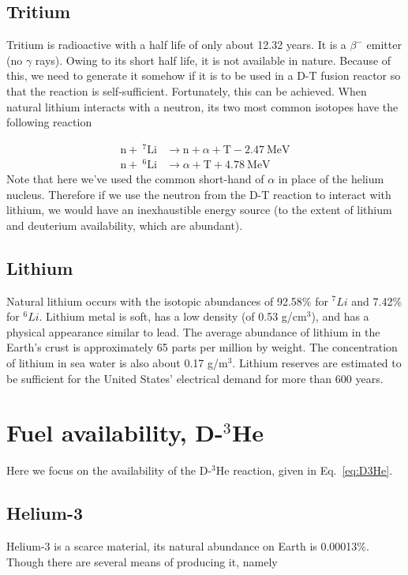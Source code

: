 \documentclass[11pt]{report} %
\begin{document}
\subsection{Tritium}
Tritium is radioactive with a half life of only about 12.32 years. It is a $\beta^-$ emitter (no $\gamma$ rays). Owing to its short half life, it is not available in nature. Because of this, we need to generate it somehow if it is to be used in a D-T fusion reactor so that the reaction is self-sufficient. Fortunately, this can be achieved. When natural lithium interacts with a neutron, its two most common isotopes have the following reaction

\begin{align}
\mathrm{n} + ~^7\mathrm{Li} &\xrightarrow ~\mathrm{n}+\alpha + \mathrm{T} -2.47~\text{MeV}\label{eq:Li7T}\\
\mathrm{n} + ~^6\mathrm{Li} &\xrightarrow ~ \alpha + \mathrm{T} +4.78~\text{MeV} \label{eq:Li6T}
\end{align}
Note that here we've used the common short-hand of $\alpha$ in place of the helium nucleus. Therefore if we use the neutron from the D-T reaction to interact with lithium, we would have an inexhaustible energy source (to the extent of lithium and deuterium availability, which are abundant).


\subsection{Lithium}

Natural lithium occurs with the isotopic abundances of 92.58\% for $^7Li$ and 7.42\% for $^6Li$. Lithium metal is soft, has a low density (of 0.53 g/cm$^3$), and has a physical appearance similar to lead. The average abundance of lithium in the Earth's crust is approximately 65 parts per million by weight. The concentration of lithium in sea water is also about 0.17 g/m$^3$. Lithium reserves are estimated to be sufficient for the United States' electrical demand for more than 600 years.

\section{Fuel availability, D-$^3$He}
Here we focus on the availability of the D-$^3$He reaction, given in Eq.~\ref{eq:D3He}.

\subsection{Helium-3}
Helium-3 is a scarce material, its natural abundance on Earth is 0.00013\%. Though there are several means of producing it, namely
\end{document}
